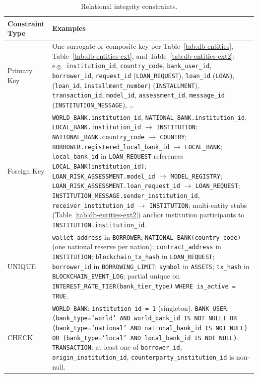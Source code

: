 \documentclass[12pt,a4paper]{report}
\newcommand{\tableheadcolor}{\rowcolor{TableHeadBg}}
\begin{document}
\begin{table}[H]
\centering
\caption[Relational integrity constraints]{Relational integrity constraints.}
\label{tab:integrity-constraints}
\begin{tabular}{p{4cm}p{9.5cm}}
\toprule
\tableheadcolor
\textbf{Constraint Type} & \textbf{Examples} \\
\midrule
Primary Key & One surrogate or composite key per Table~\ref{tab:db-entities}, Table~\ref{tab:db-entities-ext}, and Table~\ref{tab:db-entities-ext2}: e.g.\ \texttt{institution\_id}, \texttt{country\_code}, \texttt{bank\_user\_id}, \texttt{borrower\_id}, \texttt{request\_id} (\texttt{LOAN\_REQUEST}), \texttt{loan\_id} (\texttt{LOAN}), (\texttt{loan\_id}, \texttt{installment\_number}) (\texttt{INSTALLMENT}), \texttt{transaction\_id}, \texttt{model\_id}, \texttt{assessment\_id}, \texttt{message\_id} (\texttt{INSTITUTION\_MESSAGE}), \ldots \\
Foreign Key & \texttt{WORLD\_BANK.institution\_id}, \texttt{NATIONAL\_BANK.institution\_id}, \texttt{LOCAL\_BANK.institution\_id} $\to$ \texttt{INSTITUTION}; \texttt{NATIONAL\_BANK.country\_code} $\to$ \texttt{COUNTRY}; \texttt{BORROWER.registered\_local\_bank\_id} $\to$ \texttt{LOCAL\_BANK}; \texttt{local\_bank\_id} in \texttt{LOAN\_REQUEST} references \texttt{LOCAL\_BANK(institution\_id)}; \texttt{LOAN\_RISK\_ASSESSMENT.model\_id} $\to$ \texttt{MODEL\_REGISTRY}; \texttt{LOAN\_RISK\_ASSESSMENT.loan\_request\_id} $\to$ \texttt{LOAN\_REQUEST}; \texttt{INSTITUTION\_MESSAGE.sender\_institution\_id}, \texttt{receiver\_institution\_id} $\to$ \texttt{INSTITUTION}; multi-entity stubs (Table~\ref{tab:db-entities-ext2}) anchor institution participants to \texttt{INSTITUTION.institution\_id}. \\
UNIQUE & \texttt{wallet\_address} in \texttt{BORROWER}; \texttt{NATIONAL\_BANK(country\_code)} (one national reserve per nation); \texttt{contract\_address} in \texttt{INSTITUTION}; \texttt{blockchain\_tx\_hash} in \texttt{LOAN\_REQUEST}; \texttt{borrower\_id} in \texttt{BORROWING\_LIMIT}; \texttt{symbol} in \texttt{ASSETS}; \texttt{tx\_hash} in \texttt{BLOCKCHAIN\_EVENT\_LOG}; partial unique on \texttt{INTEREST\_RATE\_TIER(bank\_tier\_type)} \texttt{WHERE is\_active = TRUE}. \\
CHECK & \texttt{WORLD\_BANK}: \texttt{institution\_id = 1} (singleton). \texttt{BANK\_USER}: \texttt{(bank\_type='world' AND world\_bank\_id IS NOT NULL) OR (bank\_type='national' AND national\_bank\_id IS NOT NULL) OR (bank\_type='local' AND local\_bank\_id IS NOT NULL)}. \texttt{TRANSACTION}: at least one of \texttt{borrower\_id}, \texttt{origin\_institution\_id}, \texttt{counterparty\_institution\_id} is non-null. \\

\end{tabular}
\end{table}
\end{document}
